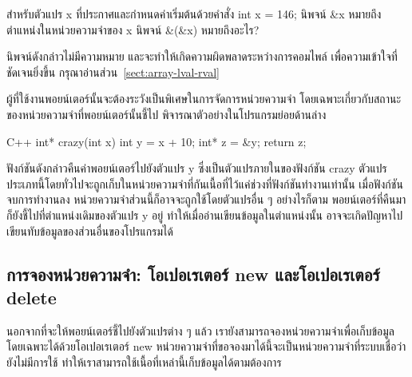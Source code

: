 \begin{quiz}{}
สำหรับ{\wbr}ตัวแปร {\ct x} ที่{\wbr}ประกาศ{\wbr}และ{\wbr}กำหนด{\wbr}ค่า{\wbr}เริ่มต้น{\wbr}ด้วย{\wbr}คำสั่ง {\ct int x = 146;}
นิพจน์ {\ct \&x} หมายถึง{\wbr}ตำแหน่ง{\wbr}ใน{\wbr}หน่วยความจำ{\wbr}ของ {\ct x} นิพจน์ {\ct \&(\&x)} หมายถึง{\wbr}อะไร?
\end{quiz}
\begin{quizans}
นิพจน์{\wbr}ดังกล่าว{\wbr}ไม่{\wbr}มี{\wbr}ความหมาย และ{\wbr}จะ{\wbr}ทำ{\wbr}ให้{\wbr}เกิด{\wbr}ความผิด{\wbr}พลาด{\wbr}ระหว่าง{\wbr}การ{\wbr}คอมไพล์{\wbr}
เพื่อ{\wbr}ความ{\wbr}เข้าใจ{\wbr}ที่{\wbr}ชัดเจน{\wbr}ยิ่ง{\wbr}ขึ้น กรุณา{\wbr}อ่าน{\wbr}ส่วน~\ref{sect:array-lval-rval}
\end{quizans}

ผู้{\wbr}ที่{\wbr}ใช้{\wbr}งาน{\wbr}พอยน์เตอร์{\wbr}นั้น{\wbr}จะ{\wbr}ต้อง{\wbr}ระวัง{\wbr}เป็นพิเศษ{\wbr}ใน{\wbr}การ{\wbr}จัดการ{\wbr}หน่วยความจำ{\wbr}
โดยเฉพาะ{\wbr}เกี่ยวกับ{\wbr}สถานะ{\wbr}ของ{\wbr}หน่วยความจำ{\wbr}ที่{\wbr}พอยน์เตอร์{\wbr}นั้น{\wbr}ชี้{\wbr}ไป{\wbr}
พิจารณา{\wbr}ตัวอย่าง{\wbr}ใน{\wbr}โปรแกรมย่อย{\wbr}ด้าน{\wbr}ล่าง{\wbr}

\latintext
\begin{codelist}{C++}{}
int* crazy(int x)
{
  int y = x + 10;  int* z = &y;
  return z;
}
\end{codelist}
\thaitext

ฟังก์ชัน{\wbr}ดังกล่าว{\wbr}คืน{\wbr}ค่า{\wbr}พอยน์เตอร์{\wbr}ไป{\wbr}ยัง{\wbr}ตัวแปร {\ct y} ซึ่ง{\wbr}เป็น{\wbr}ตัวแปร{\wbr}ภายใน{\wbr}ของ{\wbr}ฟังก์ชัน {\ct
  crazy}
ตัวแปร{\wbr}ประเภท{\wbr}นี้{\wbr}โดย{\wbr}ทั่วไป{\wbr}จะ{\wbr}ถูก{\wbr}เก็บ{\wbr}ใน{\wbr}หน่วยความจำ{\wbr}ที่{\wbr}กัน{\wbr}เนื้อที่{\wbr}ไว้{\wbr}แค่{\wbr}ช่วง{\wbr}ที่{\wbr}ฟังก์ชัน{\wbr}ทำงาน{\wbr}เท่านั้น{\wbr}
เมื่อ{\wbr}ฟังก์ชัน{\wbr}จบ{\wbr}การ{\wbr}ทำงาน{\wbr}ลง หน่วยความจำ{\wbr}ส่วน{\wbr}นี้{\wbr}ก็{\wbr}อาจ{\wbr}จะ{\wbr}ถูก{\wbr}ใช้{\wbr}โดย{\wbr}ตัวแปร{\wbr}อื่น ๆ อย่างไรก็ตาม{\wbr}
พอยน์เตอร์ที่{\wbr}คืน{\wbr}มา{\wbr}ก็{\wbr}ยัง{\wbr}ชี้{\wbr}ไป{\wbr}ที่{\wbr}ตำแหน่ง{\wbr}เดิม{\wbr}ของ{\wbr}ตัวแปร {\ct y} อยู่{\wbr}
ทำ{\wbr}ให้{\wbr}เมื่อ{\wbr}อ่าน{\wbr}เขียน{\wbr}ข้อมูล{\wbr}ใน{\wbr}ตำแหน่ง{\wbr}นั้น{\wbr}
อาจ{\wbr}จะ{\wbr}เกิด{\wbr}ปัญหา{\wbr}ไป{\wbr}เขียน{\wbr}ทับ{\wbr}ข้อมูล{\wbr}ของ{\wbr}ส่วน{\wbr}อื่น{\wbr}ของ{\wbr}โปรแกรม{\wbr}ได้{\wbr}

\subsection{การ{\wbr}จอง{\wbr}หน่วยความจำ: โอ{\wbr}เปอเรเตอร์ {\ct new} และ{\wbr}โอ{\wbr}เปอเรเตอร์ {\ct delete}}
นอกจาก{\wbr}ที่{\wbr}จะ{\wbr}ให้{\wbr}พอยน์เตอร์{\wbr}ชี้{\wbr}ไป{\wbr}ยัง{\wbr}ตัวแปร{\wbr}ต่าง ๆ แล้ว{\wbr}
เรา{\wbr}ยัง{\wbr}สามารถ{\wbr}จอง{\wbr}หน่วยความจำ{\wbr}เพื่อ{\wbr}เก็บ{\wbr}ข้อมูล{\wbr}โดยเฉพาะ{\wbr}ได้{\wbr}ด้วย{\wbr}โอ{\wbr}เปอเรเตอร์ {\ct new}
หน่วยความจำ{\wbr}ที่{\wbr}ขอ{\wbr}จอง{\wbr}มา{\wbr}ได้{\wbr}นี้{\wbr}จะ{\wbr}เป็น{\wbr}หน่วยความจำ{\wbr}ที่{\wbr}ระบบ{\wbr}เชื่อ{\wbr}ว่า{\wbr}ยัง{\wbr}ไม่{\wbr}มี{\wbr}การ{\wbr}ใช้{\wbr}
ทำ{\wbr}ให้{\wbr}เรา{\wbr}สามารถ{\wbr}ใช้เนื้อ{\wbr}ที่{\wbr}เหล่านี้{\wbr}เก็บ{\wbr}ข้อมูล{\wbr}ได้{\wbr}ตาม{\wbr}ต้องการ{\wbr}


